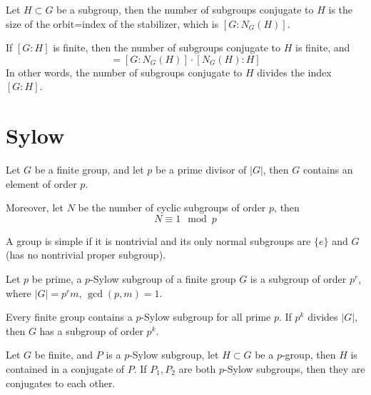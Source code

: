 \documentclass[openany]{book}
\begin{document}
\begin{thm}
    Let $H\subset G$ be a subgroup, then the number of subgroups conjugate to $H$ is the size of the orbit=index of the stabilizer, which is $[G:N_G(H)]$.
\end{thm}


\begin{cor}
    If $[G:H]$ is finite, then the number of subgroups conjugate to $H$ is finite, and 
    \begin{equation*}
        [G:H]=[G:N_G(H)]\cdot[N_G(H): H]
    \end{equation*}
    In other words, the number of subgroups conjugate to $H$ divides the index $[G:H]$.
\end{cor}


\section{Sylow}


\begin{thm}
    Let $G$ be a finite group, and let $p$ be a prime divisor of $|G|$, then $G$ contains an element of order $p$.

    Moreover, let $N$ be the number of cyclic subgroups of order $p$, then 
    \begin{equation*}
        N\equiv 1\mod p
    \end{equation*}
\end{thm}


\begin{defn}[simple]
    A group is simple if it is nontrivial and its only normal subgroups are $\{e\}$ and $G$ (has no nontrivial proper subgroup).
\end{defn}

\begin{defn}
    Let $p$ be prime, a $p$-Sylow subgroup of a finite group $G$ is a subgroup of order $p^r$, where $|G|=p^rm$, $\gcd(p,m)=1$. 
\end{defn}

\begin{thm}[Sylow I]
    Every finite group contains a $p$-Sylow subgroup for all prime $p$. If $p^k$ divides $|G|$, then $G$ has a subgroup of order $p^k$.
\end{thm}

\begin{thm}[Sylow II]
    Let $G$ be finite, and $P$ is a $p$-Sylow subgroup, let $H\subset G$ be a $p$-group, then $H$ is contained in a conjugate of $P$. If $P_1,P_2$ are both $p$-Sylow subgroups, then they are conjugates to each other.
\end{thm}
\end{document}
